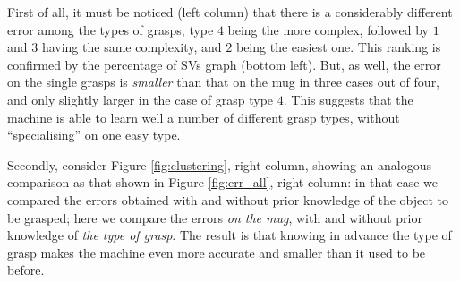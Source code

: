 First of all, it must be noticed (left column) that there is a
considerably different error among the types of grasps, type $4$ being
the more complex, followed by $1$ and $3$ having the same complexity,
and $2$ being the easiest one. This ranking is confirmed by the
percentage of SVs graph (bottom left). But, as well, the error on the
single grasps is \emph{smaller} than that on the mug in three cases
out of four, and only slightly larger in the case of grasp type
$4$. This suggests that the machine is able to learn well a number of
different grasp types, without ``specialising'' on one easy type.

Secondly, consider Figure \ref{fig:clustering}, right column, showing
an analogous comparison as that shown in Figure \ref{fig:err_all},
right column: in that case we compared the errors obtained with and
without prior knowledge of the object to be grasped; here we compare
the errors \emph{on the mug}, with and without prior knowledge of
\emph{the type of grasp}. The result is that knowing in advance the
type of grasp makes the machine even more accurate and smaller than it
used to be before.
